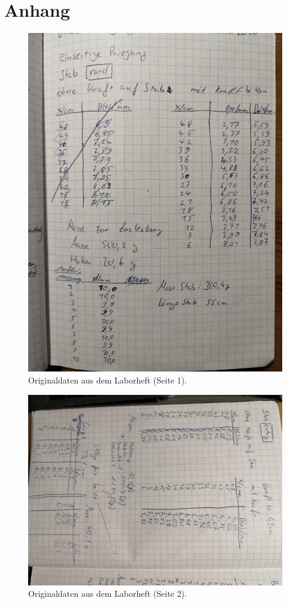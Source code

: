 \section{Anhang}
\begin{figure}
    \centering
    \includegraphics[width=\textwidth]{content/data/daten1.jpg}
    \caption{Originaldaten aus dem Laborheft (Seite 1).}
\end{figure}
\begin{figure}
    \centering
    \includegraphics[width=\textwidth,angle=90]{content/data/daten2.jpg}
    \caption{Originaldaten aus dem Laborheft (Seite 2).}
\end{figure}
